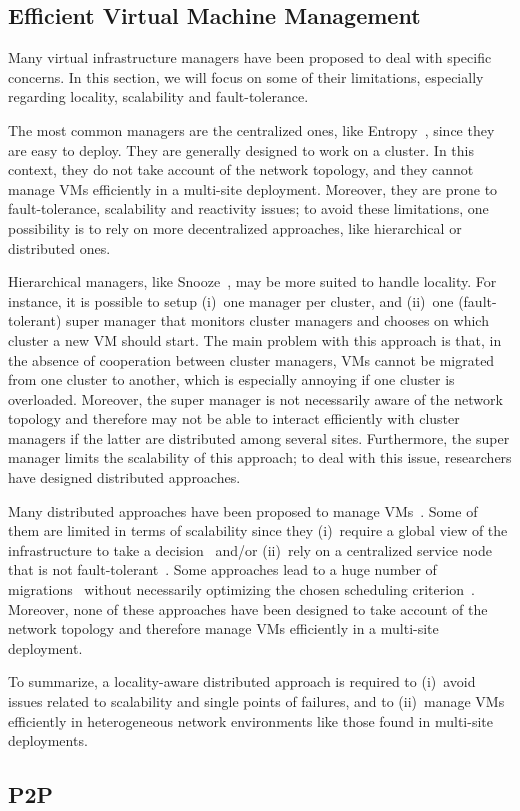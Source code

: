 
\subsection{Efficient Virtual Machine Management}

Many virtual infrastructure managers have been proposed to deal with specific
concerns.
%
In this section, we will focus on some of their limitations, especially
regarding locality, scalability and fault-tolerance.

The most common managers are the centralized ones, like
Entropy~\cite{hermenier:cp11,hermenier:2013}, since they are easy to deploy.
%
They are generally designed to work on a cluster.
%
In this context, they do not take account of the network topology, and they
cannot manage VMs efficiently in a multi-site deployment.
%
Moreover, they are prone to fault-tolerance, scalability and reactivity
issues; to avoid these limitations, one possibility is to rely on more
decentralized approaches, like hierarchical or distributed ones.

Hierarchical managers, like Snooze~\cite{feller:ccgrid12}, may be more suited to
handle locality.
%
For instance, it is possible to setup (i)~one manager per cluster, and (ii)~one
(fault-tolerant) super manager that monitors cluster managers and chooses on
which cluster a new VM should start.
%
%
The main problem with this approach is that, in the absence of cooperation
between cluster managers, VMs cannot be migrated from one cluster to another,
which is especially annoying if one cluster is overloaded.
%
Moreover, the super manager is not necessarily aware of the network topology and
therefore may not be able to interact efficiently with cluster managers if the
latter are distributed among several sites.
%
Furthermore, the super manager limits the scalability of this approach; to deal
with this issue, researchers have designed distributed approaches.

Many distributed approaches have been proposed to manage
VMs~\cite{barbagallo:lncs10,feller:cloudcom12,marzolla:wowmom11,mastroianni:europar11,rouzaudcornabas:vhpc10,yazir:cloud10}.
%
Some of them are limited in terms of scalability since they (i)~require a global
view of the infrastructure to take a
decision~\cite{rouzaudcornabas:vhpc10,yazir:cloud10} and/or (ii)~rely on a
centralized service node that is not
fault-tolerant~\cite{mastroianni:europar11,yazir:cloud10}.
%
Some approaches lead to a huge number of
migrations~\cite{barbagallo:lncs10,mastroianni:europar11} without necessarily
optimizing the chosen scheduling criterion~\cite{barbagallo:lncs10}.
%
Moreover, none of these approaches have been designed to take account of the
network topology and therefore manage VMs efficiently in a multi-site
deployment.

To summarize, a locality-aware distributed approach is required to (i)~avoid
issues related to scalability and single points of failures, and to (ii)~manage
VMs efficiently in heterogeneous network environments like those found in
multi-site deployments.

\subsection{P2P}

